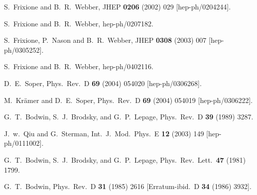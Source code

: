 \begin{thebibliography}{999}
S.~Frixione and B.~R.~Webber,
JHEP {\bf 0206} (2002) 029
[hep-ph/0204244].

S.~Frixione and B.~R.~Webber,
hep-ph/0207182.

S.~Frixione, P.~Nason and B.~R.~Webber,
JHEP {\bf 0308} (2003) 007
[hep-ph/0305252].

S.~Frixione and B.~R.~Webber,
hep-ph/0402116.

D.~E.~Soper,
Phys.\ Rev.\ D {\bf 69} (2004) 054020
[hep-ph/0306268].

M.~Kr\"amer and D.~E.~Soper,
Phys.\ Rev.\ D {\bf 69} (2004) 054019
[hep-ph/0306222].


G.~T.~Bodwin, S.~J.~Brodsky, and G.~P.~Lepage,
Phys.\ Rev.\ D {\bf 39} (1989) 3287.

J.~w.~Qiu and G.~Sterman,
Int.\ J.\ Mod.\ Phys.\ E {\bf 12} (2003) 149
[hep-ph/0111002].

G.~T.~Bodwin, S.~J.~Brodsky, and G.~P.~Lepage,
Phys.\ Rev.\ Lett.\  {\bf 47} (1981) 1799.

G.~T.~Bodwin,
Phys.\ Rev.\ D {\bf 31} (1985) 2616
[Erratum-ibid.\ D {\bf 34} (1986) 3932].



\end{thebibliography}
